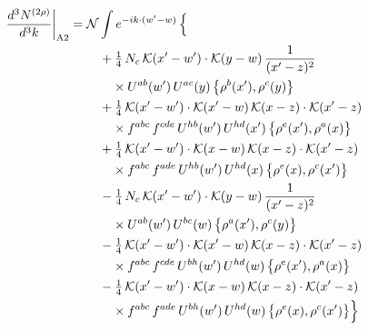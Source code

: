 \documentclass[10pt]{article}
\numberwithin{equation}{section}
\newcommand{\KK}{\mathcal K}
\newcommand{\NN}{\mathcal N}
\begin{document}
\begin{align}
\frac{d^3N^{(2\rho)}}{d^3k}\bigg|_{\rm A2}={}&\NN\int e^{-ik\cdot(w'-w)}\,\Big\{\notag\\
&\quad +\tfrac14\,N_{c}\,\KK(x'-w')\cdot\KK(y-w)\,\frac{1}{(x'-z)^2}\notag\\
&\qquad\times U^{ab}(w')\,U^{ac}(y)\,\big\{\rho^{b}(x'),\rho^{c}(y)\big\}\notag\\
&\quad +\tfrac14\,\KK(x'-w')\cdot\KK(x'-w)\,\KK(x-z)\cdot\KK(x'-z)\notag\\
&\qquad\times f^{abc}\,f^{cde}\,U^{hb}(w')\,U^{hd}(x')\,\big\{\rho^{e}(x'),\rho^{a}(x)\big\}\notag\\
&\quad +\tfrac14\,\KK(x'-w')\cdot\KK(x-w)\,\KK(x-z)\cdot\KK(x'-z)\notag\\
&\qquad\times f^{abc}\,f^{ade}\,U^{hb}(w')\,U^{hd}(x)\,\big\{\rho^{e}(x),\rho^{c}(x')\big\}\notag\\
&\quad -\tfrac14\,N_{c}\,\KK(x'-w')\cdot\KK(y-w)\,\frac{1}{(x'-z)^2}\notag\\
&\qquad\times U^{ab}(w')\,U^{bc}(w)\,\big\{\rho^{a}(x'),\rho^{c}(y)\big\}\notag\\
&\quad -\tfrac14\,\KK(x'-w')\cdot\KK(x'-w)\,\KK(x-z)\cdot\KK(x'-z)\notag\\
&\qquad\times f^{abc}\,f^{cde}\,U^{bh}(w')\,U^{hd}(w)\,\big\{\rho^{e}(x'),\rho^{a}(x)\big\}\notag\\
&\quad -\tfrac14\,\KK(x'-w')\cdot\KK(x-w)\,\KK(x-z)\cdot\KK(x'-z)\notag\\
&\qquad\times f^{abc}\,f^{ade}\,U^{bh}(w')\,U^{hd}(w)\,\big\{\rho^{e}(x),\rho^{c}(x')\big\}\Big\}\label{R:eq:sum-A2}
\end{align}
\end{document}
